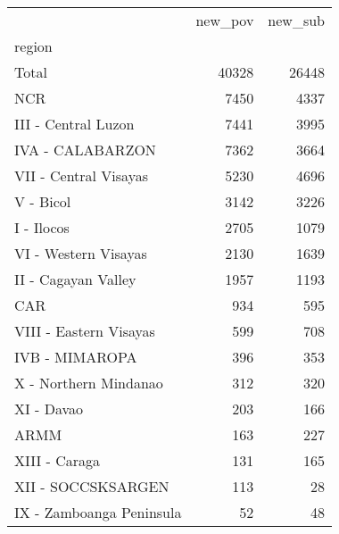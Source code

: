 \begin{tabular}{lrr}
\toprule
{} &  new\_pov &  new\_sub \\
region                   &          &          \\
\midrule
Total                    &    40328 &    26448 \\
NCR                      &     7450 &     4337 \\
III - Central Luzon      &     7441 &     3995 \\
IVA - CALABARZON         &     7362 &     3664 \\
VII - Central Visayas    &     5230 &     4696 \\
V - Bicol                &     3142 &     3226 \\
I - Ilocos               &     2705 &     1079 \\
VI - Western Visayas     &     2130 &     1639 \\
II - Cagayan Valley      &     1957 &     1193 \\
CAR                      &      934 &      595 \\
VIII - Eastern Visayas   &      599 &      708 \\
IVB - MIMAROPA           &      396 &      353 \\
X - Northern Mindanao    &      312 &      320 \\
XI - Davao               &      203 &      166 \\
ARMM                     &      163 &      227 \\
XIII - Caraga            &      131 &      165 \\
XII - SOCCSKSARGEN       &      113 &       28 \\
IX - Zamboanga Peninsula &       52 &       48 \\
\bottomrule
\end{tabular}
